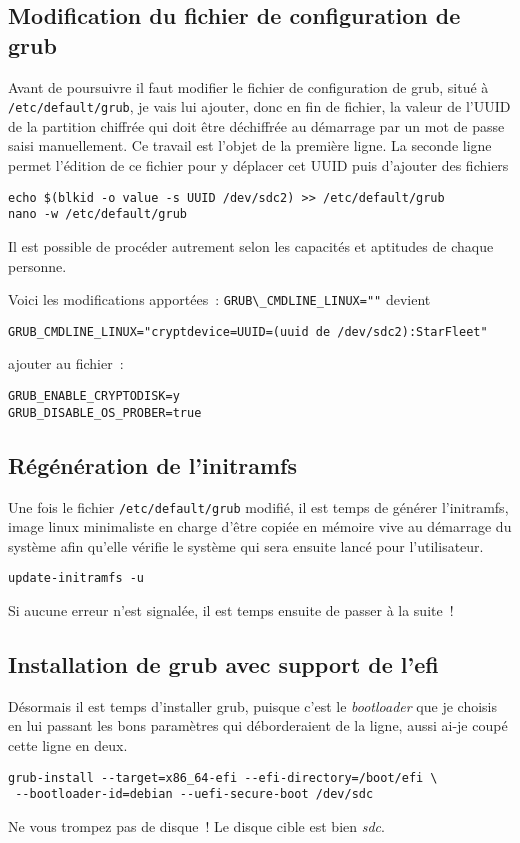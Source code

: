 \documentclass[12pt, a4paper]{article}
\begin{document}
\subsection{Modification du fichier de configuration de grub}
Avant de poursuivre il faut modifier le fichier de configuration de grub, situé à \texttt{/etc/default/grub}, je vais lui ajouter, donc en fin de fichier, la valeur de l'UUID de la partition chiffrée qui doit être déchiffrée au démarrage par un mot de passe saisi manuellement. 
Ce travail est l'objet de la première ligne. 
La seconde ligne permet l'édition de ce fichier pour y déplacer cet UUID puis d'ajouter des fichiers
\begin{verbatim}
echo $(blkid -o value -s UUID /dev/sdc2) >> /etc/default/grub
nano -w /etc/default/grub
\end{verbatim}
Il est possible de procéder autrement selon les capacités et aptitudes de chaque personne.

Voici les modifications apportées~:\newline
\verb|GRUB\_CMDLINE_LINUX=""| devient
\begin{verbatim}
GRUB_CMDLINE_LINUX="cryptdevice=UUID=(uuid de /dev/sdc2):StarFleet"
\end{verbatim}

ajouter au fichier~:
\begin{verbatim}
GRUB_ENABLE_CRYPTODISK=y
GRUB_DISABLE_OS_PROBER=true
\end{verbatim}

\subsection{Régénération de l'initramfs}
Une fois le fichier \texttt{/etc/default/grub} modifié, il est temps de générer l'initramfs, image linux minimaliste en charge d'être copiée en mémoire vive au démarrage du système afin qu'elle vérifie le système qui sera ensuite lancé pour l'utilisateur.
\begin{verbatim}
update-initramfs -u
\end{verbatim}
Si aucune erreur n'est signalée, il est temps ensuite de passer à la suite~!

\subsection{Installation de grub avec support de l'efi}
Désormais il est temps d'installer grub, puisque c'est le \emph{bootloader\/} que je choisis en lui passant les bons paramètres qui déborderaient de la ligne, aussi ai-je coupé cette ligne en deux.
\begin{verbatim}
grub-install --target=x86_64-efi --efi-directory=/boot/efi \
 --bootloader-id=debian --uefi-secure-boot /dev/sdc
\end{verbatim}
Ne vous trompez pas de disque~! 
Le disque cible est bien \emph{sdc}.
\end{document}
